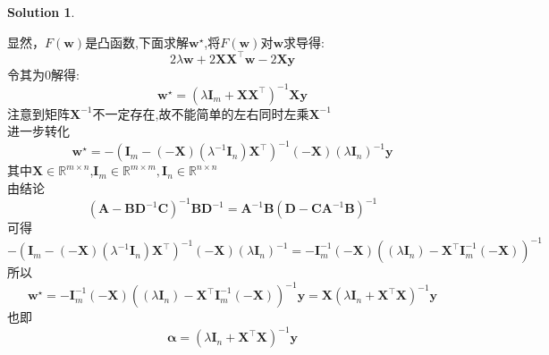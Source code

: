 \documentclass[a4paper,UTF8]{article}
\numberwithin{equation}{section}
\theoremstyle{definition}
\newtheorem*{solution}{Solution}
\begin{document}
\begin{solution}
\begin{enumerate}
    显然，$F(\bm{w})$是凸函数,下面求解$\bm{w}^\star$,将$F(\bm{w})$对$\bm{w}$求导得:\\
    $$2\lambda\bm{w}+2\bm{X}\bm{X}^\top\bm{w}-2\bm{X}\bm{y}$$
    令其为0解得:\ $$\bm{w}^\star=(\lambda\bm{I}_m+\bm{X}\bm{X}^\top)^{-1}\bm{X}\bm{y}$$
    注意到矩阵$\mathbf{X}^{-1}$不一定存在,故不能简单的左右同时左乘$\mathbf{X}^{-1}$\\
    进一步转化$$\bm{w}^\star=-(\bm{I}_m-(-\bm{X})(\lambda^{-1}\bm{I}_n)\bm{X}^\top)^{-1}(-\bm{X})(\lambda\bm{I}_n)^{-1}\bm{y}$$
    其中$\bm{X}\in\mathbb{R}^{m\times n}$,$\bm{I}_m\in\mathbb{R}^{m\times m},\bm{I}_n\in\mathbb{R}^{n\times n}$\\
    由结论$$(\bm{A}-\bm{B}\bm{D}^{-1}\bm{C})^{-1}\bm{B}\bm{D}^{-1}=\bm{A}^{-1}\bm{B}(\bm{D}-\bm{C}\bm{A}^{-1}\bm{B})^{-1}$$
    可得$$-(\bm{I}_m-(-\bm{X})(\lambda^{-1}\bm{I}_n)\bm{X}^\top)^{-1}(-\bm{X})(\lambda\bm{I}_n)^{-1}=-\bm{I}^{-1}_{m}(-\bm{X})((\lambda\bm{I}_n)-\bm{X}^\top\bm{I}^{-1}_m(-\bm{X}))^{-1}$$
    所以$$\bm{w}^\star=-\bm{I}^{-1}_{m}(-\bm{X})((\lambda\bm{I}_n)-\bm{X}^\top\bm{I}^{-1}_m(-\bm{X}))^{-1}\bm{y}=\bm{X}(\lambda\bm{I}_n+\bm{X}^\top\bm{X})^{-1}\bm{y}$$
    也即$$\bm{\alpha}=(\lambda\bm{I}_n+\bm{X}^\top\bm{X})^{-1}\bm{y}$$
    
    
    
\end{enumerate}
\end{solution}

\newpage
\end{document}
